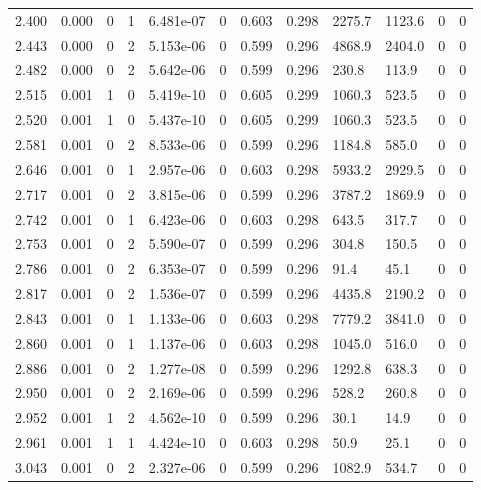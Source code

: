 \documentclass[preview]{standalone}
\begin{document}
{{{\begin{tabular}{L{1.2cm}C{1.2cm} C{0.3cm}C{0.5cm} C{1.4cm}C{1.4cm} C{1.4cm}C{1.4cm} C{1.6cm}C{1.6cm} C{1.6cm}C{1.6cm}}
  2.400  &  0.000  & 0     &  1 &  6.481e-07  & 0  &  0.603&   0.298& 2275.7 & 1123.6   &  0 & 0  \\ 
  2.443  &  0.000  & 0     &  2 &  5.153e-06  & 0  &  0.599&   0.296& 4868.9 & 2404.0   &  0 & 0  \\ 
  2.482  &  0.000  & 0     &  2 &  5.642e-06  & 0  &  0.599&   0.296& 230.8 & 113.9   &  0 & 0  \\ 
  2.515  &  0.001  & 1     &  0 &  5.419e-10  & 0  &  0.605&   0.299& 1060.3 & 523.5   &  0 & 0  \\ 
  2.520  &  0.001  & 1     &  0 &  5.437e-10  & 0  &  0.605&   0.299& 1060.3 & 523.5   &  0 & 0  \\ 
  2.581  &  0.001  & 0     &  2 &  8.533e-06  & 0  &  0.599&   0.296& 1184.8 & 585.0   &  0 & 0  \\ 
  2.646  &  0.001  & 0     &  1 &  2.957e-06  & 0  &  0.603&   0.298& 5933.2 & 2929.5   &  0 & 0  \\ 
  2.717  &  0.001  & 0     &  2 &  3.815e-06  & 0  &  0.599&   0.296& 3787.2 & 1869.9   &  0 & 0  \\ 
  2.742  &  0.001  & 0     &  1 &  6.423e-06  & 0  &  0.603&   0.298& 643.5 & 317.7   &  0 & 0  \\ 
  2.753  &  0.001  & 0     &  2 &  5.590e-07  & 0  &  0.599&   0.296& 304.8 & 150.5   &  0 & 0  \\ 
  2.786  &  0.001  & 0     &  2 &  6.353e-07  & 0  &  0.599&   0.296& 91.4 & 45.1   &  0 & 0  \\ 
  2.817  &  0.001  & 0     &  2 &  1.536e-07  & 0  &  0.599&   0.296& 4435.8 & 2190.2   &  0 & 0  \\ 
  2.843  &  0.001  & 0     &  1 &  1.133e-06  & 0  &  0.603&   0.298& 7779.2 & 3841.0   &  0 & 0  \\ 
  2.860  &  0.001  & 0     &  1 &  1.137e-06  & 0  &  0.603&   0.298& 1045.0 & 516.0   &  0 & 0  \\ 
  2.886  &  0.001  & 0     &  2 &  1.277e-08  & 0  &  0.599&   0.296& 1292.8 & 638.3   &  0 & 0  \\ 
  2.950  &  0.001  & 0     &  2 &  2.169e-06  & 0  &  0.599&   0.296& 528.2 & 260.8   &  0 & 0  \\ 
  2.952  &  0.001  & 1     &  2 &  4.562e-10  & 0  &  0.599&   0.296& 30.1 & 14.9   &  0 & 0  \\ 
  2.961  &  0.001  & 1     &  1 &  4.424e-10  & 0  &  0.603&   0.298& 50.9 & 25.1   &  0 & 0  \\ 
  3.043  &  0.001  & 0     &  2 &  2.327e-06  & 0  &  0.599&   0.296& 1082.9 & 534.7   &  0 & 0  \\ 

\end{tabular}}}}
\end{document}
